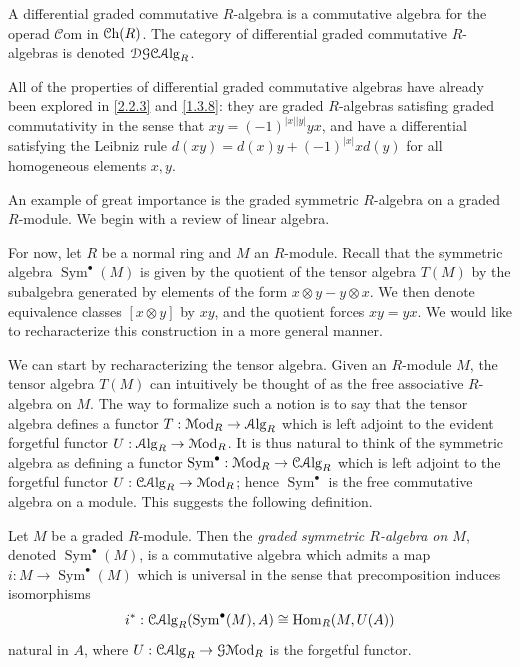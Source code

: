 \begin{definition}\label{2.2.4}
	A differential graded commutative $R$-algebra is a commutative algebra for the operad $\mathcal{C} \mathrm{om} $ in $\mathcal{C}\mathrm{h}(R) $. The category of differential graded commutative $R$-algebras is denoted $\mathcal{DG} \mathcal{C}\mathcal{A}\mathrm{lg}_R$.
\end{definition}

\begin{discussion}\label{2.2.5}
	All of the properties of differential graded commutative algebras have already been explored in \cref{2.2.3} and \cref{1.3.8}: they are graded $R$-algebras satisfing graded commutativity in the sense that $xy=(-1)^{\left| x \right| \left| y \right| } yx$, and have a differential satisfying the Leibniz rule $d(xy)=d(x)y + (-1)^{\left| x \right| }xd(y)$ for all homogeneous elements $x,y$.
\end{discussion}

An example of great importance is the graded symmetric $R$-algebra on a graded $R$-module. We begin with a review of linear algebra.

\begin{discussion}\label{2.2.6}
	For now, let $R$ be a normal ring and $M$ an $R$-module. Recall that the symmetric algebra $\operatorname{Sym} ^{\bullet} (M)$ is given by the quotient of the tensor algebra $T(M)$ by the subalgebra generated by elements of the form $x\otimes y-y\otimes x$. We then denote equivalence classes $[x\otimes y]$ by $xy$, and the quotient forces $xy=yx$. We would like to recharacterize this construction in a more general manner.

	We can start by recharacterizing the tensor algebra. Given an $R$-module $M$, the tensor algebra $T(M)$ can intuitively be thought of as the free associative $R$-algebra on $M$. The way to formalize such a notion is to say that the tensor algebra defines a functor $T : \mathcal{M}\mathrm{od} _R \to \mathcal{A}\mathrm{lg}_R$ which is left adjoint to the evident forgetful functor $U : \mathcal{A}\mathrm{lg}_R \to \mathcal{M}\mathrm{od} _R$. It is thus natural to think of the symmetric algebra as defining a functor $\operatorname{Sym}^{\bullet}  : \mathcal{M}\mathrm{od} _R \to \mathcal{C}\mathcal{A}\mathrm{lg}_R$ which is left adjoint to the forgetful functor $U : \mathcal{C} \mathcal{A}\mathrm{lg}_R \to \mathcal{M}\mathrm{od} _R$; hence $\operatorname{Sym}^{\bullet}  $ is the free commutative algebra on a module. This suggests the following definition.
\end{discussion}

\begin{definition}\label{2.2.7}
	Let $M$ be a graded $R$-module. Then the \emph{graded symmetric $R$-algebra on $M$}, denoted $\operatorname{Sym}^{\bullet} (M)$, is a commutative algebra which admits a map $i : M \to \operatorname{Sym}^{\bullet}(M)$ which is universal in the sense that precomposition induces isomorphisms
	\[
		i^* : \mathcal{C} \mathcal{A}\mathrm{lg}_R(\operatorname{Sym}^{\bullet}  (M),A) \cong \operatorname{Hom}_R(M,U(A))
	\]
	natural in $A$, where $U : \mathcal{C} \mathcal{A}\mathrm{lg}_R \to \mathcal{G} \mathcal{M}\mathrm{od} _R$ is the forgetful functor.
\end{definition}

